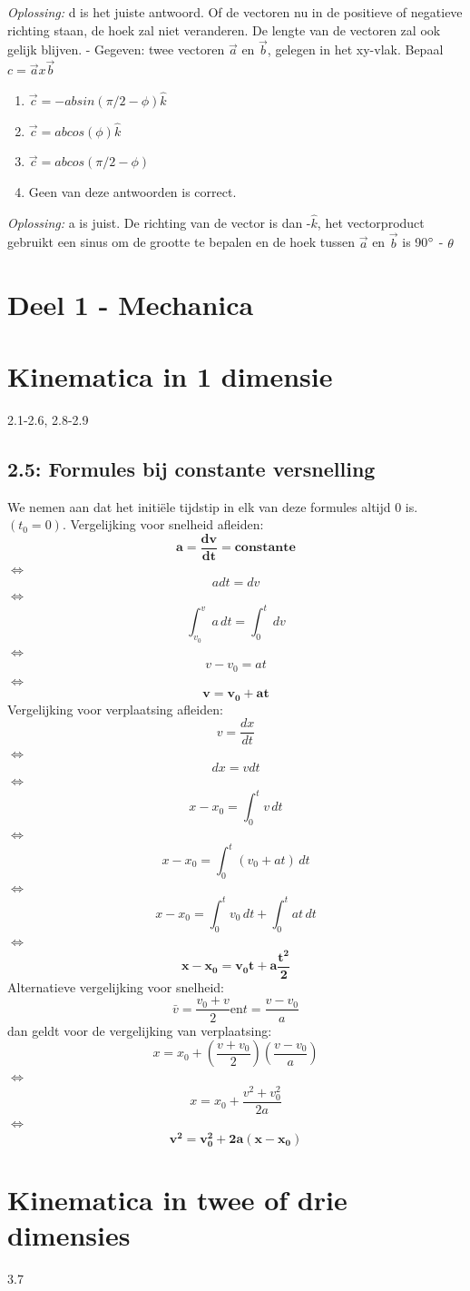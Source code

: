 \documentclass[12pt,a4paper]{article}
\begin{document}
	\textit{Oplossing:} d is het juiste antwoord. Of de vectoren nu in de positieve of negatieve richting staan, de hoek zal niet veranderen. De lengte van de vectoren zal ook gelijk blijven.
	\newline
	- Gegeven: twee vectoren $\vec{a}$ en $\vec{b}$, gelegen in het xy-vlak. Bepaal \(c = \vec{a} x \vec{b}\)
	\begin{enumerate}[label=\alph*)]
		\item \(\vec{c} = - ab sin(\pi/2 - \phi)\hat{k}\)
		\item \(\vec{c} = abcos(\phi)\hat{k}\)
		\item \(\vec{c} = abcos(\pi/2 - \phi)\)
		\item Geen van deze antwoorden is correct. 
	\end{enumerate}
	\textit{Oplossing:} a is juist. De richting van de vector is dan -$\hat{k}$, het vectorproduct gebruikt een sinus om de grootte te bepalen en de hoek tussen $\vec{a}$ en $\vec{b}$ is 90$\degree$ - $\theta$
	\newpage
	\section{Deel 1 - Mechanica}
	\section{Kinematica in 1 dimensie}
	2.1-2.6, 2.8-2.9
	\subsection{2.5: Formules bij constante versnelling}
	We nemen aan dat het initiële tijdstip in elk van deze formules altijd 0 is. \((t_{0} = 0)\).
	Vergelijking voor snelheid afleiden: 
	\[\mathbf{a = \frac{dv}{dt} = constante}\]
	$\iff$ \[a dt = dv\]
	$\iff$ \[\int_{v_0}^{v} a \, dt = \int_{0}^{t} \,dv\]
	$\iff$\[v - v_0 = at\]
	$\iff$\[\mathbf{v = v_0 + at}\]
	Vergelijking voor verplaatsing afleiden: 
	\[v = \frac{dx}{dt}\]
	$\iff$\[dx = v dt\]
	$\iff$\[x - x_0 = \int_{0}^{t} v \, dt\]
	$\iff$\[x - x_0 = \int_{0}^{t} (v_0 + at) \, dt\]
	$\iff$\[x - x_0 = \int_{0}^{t} v_0 \, dt + \int_{0}^{t} at \, dt\]
	$\iff$\[\mathbf{x - x_0 = v_0t + a\frac{t^2}{2}}\]
	Alternatieve vergelijking voor snelheid: 
	\[\bar{v} = \frac{v_0 + v}{2} \text{en} t = \frac{v - v_0}{a}\]
	dan geldt voor de vergelijking van verplaatsing: 
	\[x = x_0 + (\frac{v + v_0}{2})(\frac{v - v_0}{a})\]
	$\iff$\[x = x_0 + \frac{v^2 + v_0^2}{2a}\]
	$\iff$\[\mathbf{v^2 = v_0^2 + 2a(x - x_0)}\]
	\section{Kinematica in twee of drie dimensies}
	3.7
\end{document}
